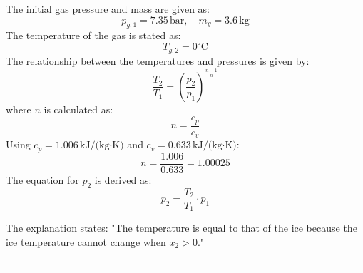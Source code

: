 The initial gas pressure and mass are given as:  
\[
p_{g,1} = 7.35 \, \text{bar}, \quad m_g = 3.6 \, \text{kg}
\]  
The temperature of the gas is stated as:  
\[
T_{g,2} = 0^\circ\text{C}
\]  
The relationship between the temperatures and pressures is given by:  
\[
\frac{T_2}{T_1} = \left( \frac{p_2}{p_1} \right)^{\frac{n-1}{n}}
\]  
where \( n \) is calculated as:  
\[
n = \frac{c_p}{c_v}
\]  
Using \( c_p = 1.006 \, \text{kJ/(kg·K)} \) and \( c_v = 0.633 \, \text{kJ/(kg·K)} \):  
\[
n = \frac{1.006}{0.633} = 1.00025
\]  
The equation for \( p_2 \) is derived as:  
\[
p_2 = \frac{T_2}{T_1} \cdot p_1
\]  

The explanation states: "The temperature is equal to that of the ice because the ice temperature cannot change when \( x_2 > 0 \)."  

---